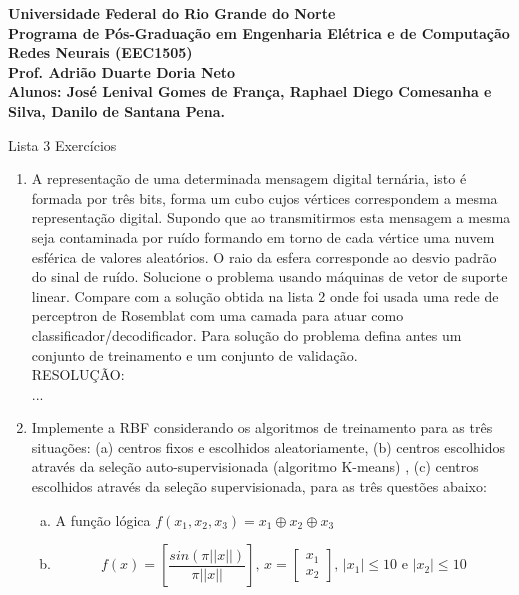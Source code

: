 \documentclass[a4paper,oneside,12pt]{article}
\begin{document}
\bfseries
\noindent
Universidade Federal do Rio Grande do Norte \\
Programa de P\'os-Gradua\c{c}\~ao em Engenharia El\'etrica e de Computa\c{c}\~ao \\
Redes Neurais (EEC1505) \\
Prof. Adri\~ao Duarte Doria Neto \\
Alunos: Jos\'e Lenival Gomes de Fran\c{c}a, Raphael Diego Comesanha e Silva, Danilo de Santana Pena.
\mdseries

\begin{center}
Lista 3 Exerc\'icios
\end{center}

\begin{enumerate}[1.]
\item A representa\c{c}\~ao de uma determinada mensagem digital tern\'aria, isto \'e formada por tr\^es bits, forma um cubo cujos v\'ertices correspondem a mesma representa\c{c}\~ao digital. Supondo que ao transmitirmos esta mensagem a mesma seja contaminada por ru\'ido formando em torno de cada v\'ertice uma nuvem esf\'erica de valores aleat\'orios. O raio da esfera corresponde ao desvio padr\~ao do sinal de ru\'ido. Solucione o problema usando m\'aquinas de vetor de suporte linear. Compare com a solu\c{c}\~ao obtida na lista 2 onde foi usada uma rede de perceptron de Rosemblat com uma camada para atuar como classificador/decodificador. Para solu\c{c}\~ao do problema defina antes um conjunto de treinamento e um conjunto de valida\c{c}\~ao. \\

RESOLU\c{C}\~AO: \\

... \\

\item Implemente a RBF considerando os algoritmos de treinamento para as tr\^{e}s situa\c{c}\~oes: (a) centros fixos e escolhidos aleatoriamente, (b) centros escolhidos atrav\'es da sele\c{c}\~ao auto-supervisionada (algoritmo K-means) , (c) centros escolhidos atrav\'es da sele\c{c}\~ao supervisionada, para as tr\^es quest\~oes abaixo: \\

\begin{enumerate}[a)]
\item A fun\c{c}\~ao l\'ogica $f(x_{1}, x_{2}, x_{3}) = x_{1} \oplus x_{2} \oplus x_{3}$

\item \begin{equation*}
f(x) = \left[ \frac{sin(\pi ||x||)}{\pi ||x||} \right] \text{, } x = \begin{bmatrix}
x_{1} \\
x_{2}
\end{bmatrix} \text{, } |x_{1}| \leq 10 \text{ e } |x_{2}| \leq 10
\end{equation*}


\end{enumerate}
\end{enumerate}
\end{document}
